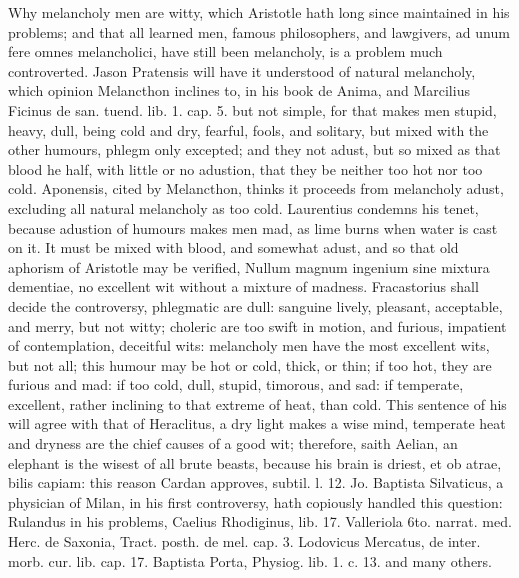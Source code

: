 {Why melancholy men are witty, which Aristotle hath long since
maintained in his problems; and that all learned men, famous
philosophers, and lawgivers, ad unum fere omnes melancholici, have
still been melancholy, is a problem much controverted. Jason Pratensis
will have it understood of natural melancholy, which opinion Melancthon
inclines to, in his book de Anima, and Marcilius Ficinus de san. tuend.
lib. 1. cap. 5. but not simple, for that makes men stupid, heavy, dull,
being cold and dry, fearful, fools, and solitary, but mixed with the
other humours, phlegm only excepted; and they not adust, but so
mixed as that blood he half, with little or no adustion, that they be
neither too hot nor too cold. Aponensis, cited by Melancthon, thinks it
proceeds from melancholy adust, excluding all natural melancholy as too
cold. Laurentius condemns his tenet, because adustion of humours makes
men mad, as lime burns when water is cast on it. It must be mixed with
blood, and somewhat adust, and so that old aphorism of Aristotle may be
verified, Nullum magnum ingenium sine mixtura dementiae, no excellent
wit without a mixture of madness. Fracastorius shall decide the
controversy, phlegmatic are dull: sanguine lively, pleasant,
acceptable, and merry, but not witty; choleric are too swift in motion,
and furious, impatient of contemplation, deceitful wits: melancholy men
have the most excellent wits, but not all; this humour may be hot or
cold, thick, or thin; if too hot, they are furious and mad: if too
cold, dull, stupid, timorous, and sad: if temperate, excellent, rather
inclining to that extreme of heat, than cold. This sentence of his will
agree with that of Heraclitus, a dry light makes a wise mind, temperate
heat and dryness are the chief causes of a good wit; therefore, saith
Aelian, an elephant is the wisest of all brute beasts, because his
brain is driest, et ob atrae, bilis capiam: this reason Cardan
approves, subtil. l. 12. Jo. Baptista Silvaticus, a physician of Milan,
in his first controversy, hath copiously handled this question:
Rulandus in his problems, Caelius Rhodiginus, lib. 17. Valleriola 6to.
narrat. med. Herc. de Saxonia, Tract. posth. de mel. cap. 3. Lodovicus
Mercatus, de inter. morb. cur. lib. cap. 17. Baptista Porta, Physiog.
lib. 1. c. 13. and many others.

}
